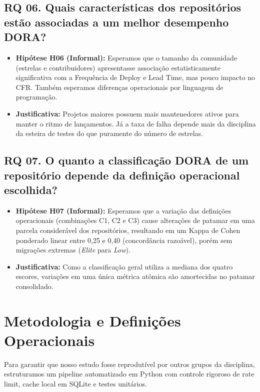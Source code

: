 \documentclass[12pt]{article}
\begin{document}
\subsection{RQ 06. Quais características dos repositórios estão associadas a um melhor desempenho DORA?}
\begin{itemize}
    \item \textbf{Hipótese H06 (Informal):} Esperamos que o tamanho da comunidade (estrelas e contribuidores) apresentasse associação estatisticamente significativa com a Frequência de Deploy e Lead Time, mas pouco impacto no CFR. Também esperamos diferenças operacionais por linguagem de programação.
    \item \textbf{Justificativa:} Projetos maiores possuem mais mantenedores ativos para manter o ritmo de lançamentos. Já a taxa de falha depende mais da disciplina da esteira de testes do que puramente do número de estrelas.
\end{itemize}

\subsection{RQ 07. O quanto a classificação DORA de um repositório depende da definição operacional escolhida?}
\begin{itemize}
    \item \textbf{Hipótese H07 (Informal):} Esperamos que a variação das definições operacionais (combinações C1, C2 e C3) cause alterações de patamar em uma parcela considerável dos repositórios, resultando em um Kappa de Cohen ponderado linear entre 0,25 e 0,40 (concordância razoável), porém sem migrações extremas (\textit{Elite} para \textit{Low}).
    \item \textbf{Justificativa:} Como a classificação geral utiliza a mediana dos quatro escores, variações em uma única métrica atômica são amortecidas no patamar consolidado.
\end{itemize}

\section{Metodologia e Definições Operacionais}

Para garantir que nosso estudo fosse reprodutível por outros grupos da disciplina, estruturamos um pipeline automatizado em Python com controle rigoroso de rate limit, cache local em SQLite e testes unitários.
\end{document}
